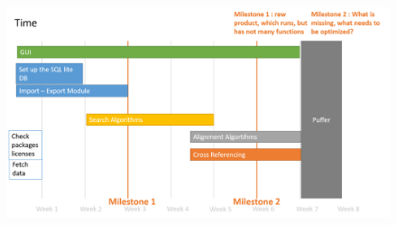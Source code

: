 \documentclass[]{article}
\begin{document}
	\begin{figure}[h]
		\includegraphics[width=\textwidth]{../img/Time.png}
	\end{figure}
\end{document}
